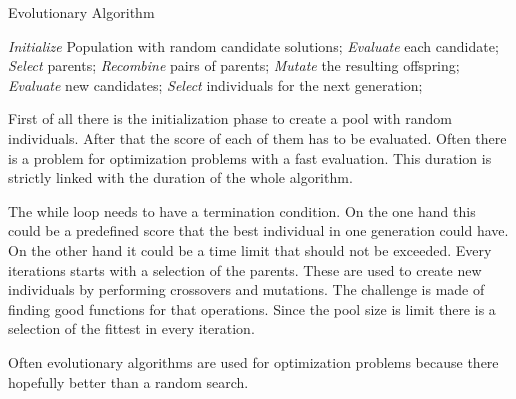 \begin{algorithm}
\caption{Evolutionary Algorithm~\cite{evo}}
\label{alg:evo}
\begin{algorithmic}
\State \emph{Initialize} Population with random candidate solutions;
\State \emph{Evaluate} each candidate;
\State \emph{Select} parents;
\State \emph{Recombine} pairs of parents;
\State \emph{Mutate} the resulting offspring;
\State \emph{Evaluate} new candidates;
\State \emph{Select} individuals for the next generation;
\EndWhile
\end{algorithmic}
\end{algorithm}

First of all there is the initialization phase to create a pool with random
individuals. After that the score of each of them has to be evaluated. Often there
is a problem for optimization problems with a fast evaluation. This duration is
strictly linked with the duration of the whole algorithm.

The while loop needs to have a termination condition. On the one hand this could be
a predefined score that the best individual in one generation could have. On the other 
hand it could be a time limit that should not be exceeded.
Every iterations starts with a selection of the parents.
These are used to create new individuals by performing crossovers and mutations.
The challenge is made of finding good functions for that operations. 
Since the pool size is limit there is a selection of the fittest in every iteration.

Often evolutionary algorithms are used for optimization problems because there
hopefully better than a random search.

